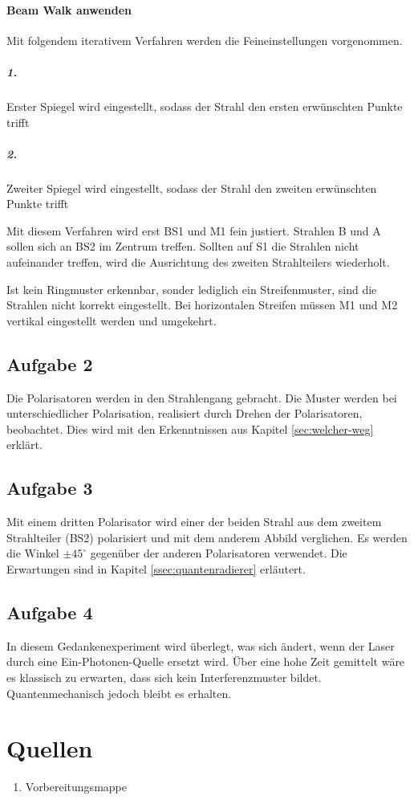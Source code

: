 \documentclass[a4paper,ngerman]{scrartcl}
\begin{document}
\paragraph{Beam Walk anwenden}
Mit folgendem iterativem Verfahren werden die Feineinstellungen vorgenommen.
\subparagraph{1.}
Erster Spiegel wird eingestellt, sodass der Strahl den ersten erwünschten Punkte trifft
\subparagraph{2.}
Zweiter Spiegel wird eingestellt, sodass der Strahl den zweiten erwünschten Punkte trifft

Mit diesem Verfahren wird erst BS1 und M1 fein justiert. Strahlen B und A sollen sich an BS2 im Zentrum treffen.
Sollten auf S1 die Strahlen nicht aufeinander treffen, wird die Ausrichtung des zweiten Strahlteilers wiederholt.

Ist kein Ringmuster erkennbar, sonder lediglich ein Streifenmuster, sind die Strahlen nicht korrekt eingestellt. Bei horizontalen Streifen müssen M1 und M2 vertikal eingestellt werden und umgekehrt.

\subsection{Aufgabe 2}
Die Polarisatoren werden in den Strahlengang gebracht. Die Muster werden bei unterschiedlicher Polarisation, realisiert durch Drehen der Polarisatoren, beobachtet. Dies wird mit den Erkenntnissen aus Kapitel \ref{sec:welcher-weg} erklärt.

\subsection{Aufgabe 3}

Mit einem dritten Polarisator wird einer der beiden Strahl aus dem zweitem Strahlteiler (BS2) polarisiert und mit dem anderem Abbild verglichen. Es werden die Winkel $\pm 45^\circ$ gegenüber der anderen Polarisatoren verwendet. Die Erwartungen  sind in Kapitel \ref{ssec:quantenradierer} erläutert.

\subsection{Aufgabe 4}

In diesem Gedankenexperiment wird überlegt, was sich ändert, wenn der Laser durch eine Ein-Photonen-Quelle ersetzt wird. Über eine hohe Zeit gemittelt wäre es klassisch zu erwarten, dass sich kein Interferenzmuster bildet. Quantenmechanisch jedoch bleibt es erhalten.



\clearpage
\section{Quellen}
\begin{enumerate}
\item Vorbereitungsmappe \label{ref:mappe}
\end{enumerate}
\end{document}
